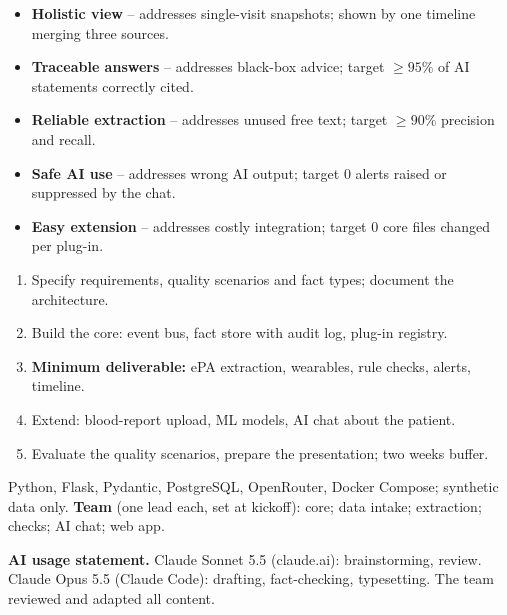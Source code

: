 \documentclass[11pt,a4paper]{article}
\newcommand{\pibapart}[1]{\vspace{0.4em}{\large\textbf{#1}}\par}
\begin{document}
\pibapart{Benefits}
\begin{itemize}
  \item \textbf{Holistic view} -- addresses single-visit snapshots; shown by one
  timeline merging three sources.
  \item \textbf{Traceable answers} -- addresses black-box advice; target ${\geq}95\%$
  of AI statements correctly cited.
  \item \textbf{Reliable extraction} -- addresses unused free text; target
  ${\geq}90\%$ precision and recall.
  \item \textbf{Safe AI use} -- addresses wrong AI output; target 0 alerts raised or
  suppressed by the chat.
  \item \textbf{Easy extension} -- addresses costly integration; target 0 core files
  changed per plug-in.
\end{itemize}

\pibapart{Action}
\begin{enumerate}
  \item Specify requirements, quality scenarios and fact types; document the architecture.
  \item Build the core: event bus, fact store with audit log, plug-in registry.
  \item \textbf{Minimum deliverable:} ePA extraction, wearables, rule checks, alerts,
  timeline.
  \item Extend: blood-report upload, ML models, AI chat about the patient.
  \item Evaluate the quality scenarios, prepare the presentation; two weeks buffer.
\end{enumerate}
Python, Flask, Pydantic, PostgreSQL, OpenRouter, Docker Compose; synthetic data only.
\textbf{Team} (one lead each, set at kickoff): core; data intake; extraction;
checks; AI chat; web app.

\vfill
{\small\textbf{AI usage statement.} Claude Sonnet 5.5 (claude.ai): brainstorming,
review. Claude Opus 5.5 (Claude Code): drafting, fact-checking, typesetting. The
team reviewed and adapted all content.}
\end{document}
